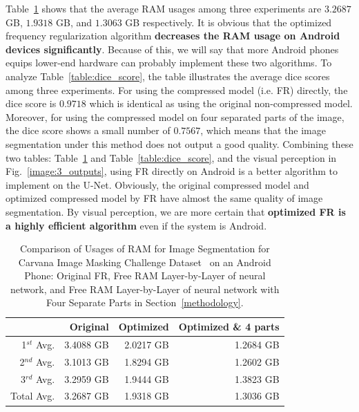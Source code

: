 \documentclass[runningheads]{llncs}
\begin{document}
 Table~\ref{table:ram_usage} shows that the average RAM usages among three experiments are $3.2687$ GB, $1.9318$ GB, and $1.3063$ GB respectively. It is obvious that the optimized frequency regularization algorithm \textbf{decreases the RAM usage on Android devices significantly}. Because of this, we will say that more Android phones equips lower-end hardware can probably implement these two algorithms. To analyze Table~\ref{table:dice_score}, the table illustrates the average dice scores among three experiments. For using the compressed model (i.e. FR) directly, the dice score is $0.9718$ which is identical as using the original non-compressed model. Moreover, for using the compressed model on four separated parts of the image, the dice score shows a small number of $0.7567$, which means that the image segmentation under this method does not output a good quality. Combining these two tables: Table~\ref{table:ram_usage} and Table~\ref{table:dice_score}, and the visual perception in Fig.~\ref{image:3_outputs}, using FR directly on Android is a better algorithm to implement on the U-Net. Obviously, the original compressed model and optimized compressed model by FR have almost the same quality of image segmentation. By visual perception, we are more certain that \textbf{optimized FR is a highly efficient algorithm} even if the system is Android.


\begin{table}[H]
	\caption{Comparison of Usages of RAM for Image Segmentation for Carvana Image Masking Challenge Dataset~\cite{brian2017carvanadataset} on an Android Phone: Original FR, Free RAM Layer-by-Layer of neural network, and Free RAM Layer-by-Layer of neural network with Four Separate Parts in Section~\ref{methodology}.} 
	\label{table:ram_usage}
	\small
	\centering
	\setlength{\tabcolsep}{10pt}
	\begin{tabular}{rrrr}
		\toprule
		& Original & Optimized & Optimized \& 4 parts\\
		\midrule\midrule
		1$^{st}$ Avg.&3.4088 GB&2.0217 GB&1.2684 GB\\
		2$^{nd}$ Avg.&3.1013 GB&1.8294 GB&1.2602 GB\\
		3$^{rd}$ Avg.&3.2959 GB&1.9444 GB&1.3823 GB\\
		\cdashline{1-4}
		Total Avg.&3.2687 GB&1.9318 GB&1.3036 GB\\
		\bottomrule
	\end{tabular}
\end{table}
\end{document}

